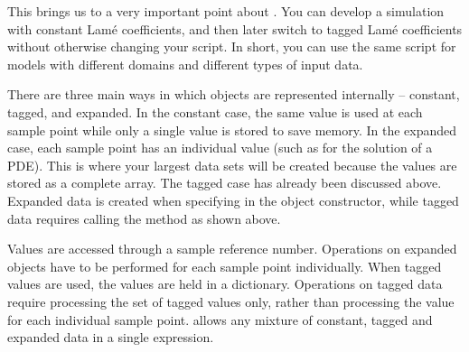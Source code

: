 This brings us to a very important point about \escript.
You can develop a simulation with constant Lam\'e coefficients, and then later
switch to tagged Lam\'e coefficients without otherwise changing your \PYTHON script.
In short, you can use the same script for models with different domains and
different types of input data.

There are three main ways in which \Data objects are represented internally --
constant, tagged, and expanded.
In the constant case, the same value is used at each sample point while only a
single value is stored to save memory.
In the expanded case, each sample point has an individual value (such as for the solution of a PDE).
This is where your largest data sets will be created because the values are
stored as a complete array.
The tagged case has already been discussed above.
Expanded data is created when specifying  in the \Data
object constructor, while tagged data requires calling the 
method as shown above.

Values are accessed through a sample reference number.
Operations on expanded \Data objects have to be performed for each sample
point individually.
When tagged values are used, the values are held in a dictionary.
Operations on tagged data require processing the set of tagged values only,
rather than processing the value for each individual sample point.
\escript allows any mixture of constant, tagged and expanded data in a single expression.

